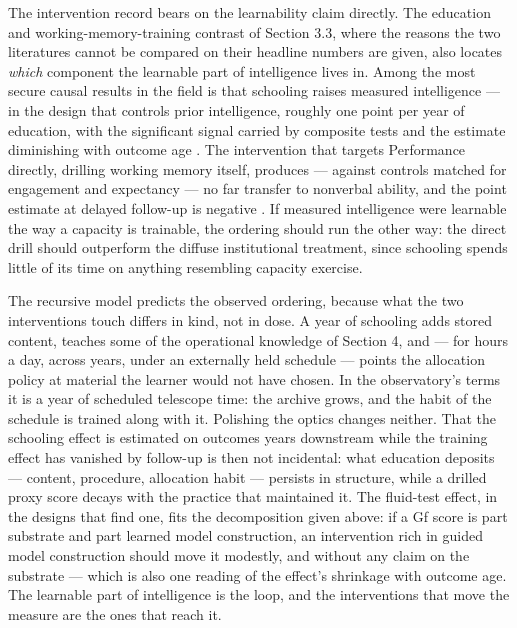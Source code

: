 \documentclass[12pt,a4paper]{article}
\begin{document}
The intervention record bears on the learnability claim directly. The education and working-memory-training contrast of Section 3.3, where the reasons the two literatures cannot be compared on their headline numbers are given, also locates \emph{which} component the learnable part of intelligence lives in. Among the most secure causal results in the field is that schooling raises measured intelligence ---\hspace{0pt} in the design that controls prior intelligence, roughly one point per year of education, with the significant signal carried by composite tests and the estimate diminishing with outcome age \citep{RitchieTuckerDrob2018}. The intervention that targets Performance directly, drilling working memory itself, produces ---\hspace{0pt} against controls matched for engagement and expectancy ---\hspace{0pt} no far transfer to nonverbal ability, and the point estimate at delayed follow-up is negative \citep{MelbyLervag2016}. If measured intelligence were learnable the way a capacity is trainable, the ordering should run the other way: the direct drill should outperform the diffuse institutional treatment, since schooling spends little of its time on anything resembling capacity exercise.

The recursive model predicts the observed ordering, because what the two interventions touch differs in kind, not in dose. A year of schooling adds stored content, teaches some of the operational knowledge of Section 4, and ---\hspace{0pt} for hours a day, across years, under an externally held schedule ---\hspace{0pt} points the allocation policy at material the learner would not have chosen. In the observatory's terms it is a year of scheduled telescope time: the archive grows, and the habit of the schedule is trained along with it. Polishing the optics changes neither. That the schooling effect is estimated on outcomes years downstream while the training effect has vanished by follow-up is then not incidental: what education deposits ---\hspace{0pt} content, procedure, allocation habit ---\hspace{0pt} persists in structure, while a drilled proxy score decays with the practice that maintained it. The fluid-test effect, in the designs that find one, fits the decomposition given above: if a Gf score is part substrate and part learned model construction, an intervention rich in guided model construction should move it modestly, and without any claim on the substrate ---\hspace{0pt} which is also one reading of the effect's shrinkage with outcome age. The learnable part of intelligence is the loop, and the interventions that move the measure are the ones that reach it.
\end{document}

